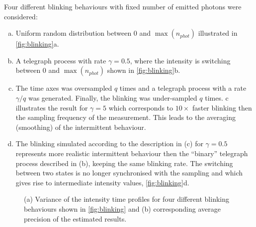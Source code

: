 Four different blinking behaviours with fixed number of emitted photons were considered: 
%
\begin{enumerate}[(a)]
	\item
	Uniform random distribution between $0$ and $\max(n_{phot})$ illustrated in  \autoref{fig:blinking}a. 
	\item
	A telegraph process with rate $\gamma=0.5$, where the intensity is switching between $0$ and $\max(n_{phot})$ shown in \autoref{fig:blinking}b.
	\item
	The time axes was oversampled $q$ times and a telegraph process with a rate $\gamma/q$ was generated. Finally, the blinking was under-sampled $q$ times. c illustrates the result for $\gamma=5$ which corresponds to $10\times$ faster blinking then the sampling frequency of the measurement. This leads to the averaging (smoothing) of the intermittent behaviour.
	\item
	The blinking simulated according to the description in (c) for $\gamma=0.5$ represents more realistic intermittent behaviour then the ``binary'' telegraph process described in (b), keeping the same blinking rate. The switching between two states is no longer synchronised with the sampling and which gives rise to intermediate intensity values, \autoref{fig:blinking}d. 
\end{enumerate}
	
\begin{figure}[!h]
	\centering
	\newcommand{\sizefig}{.40}
	\caption{(a) Variance of the intensity time profiles for four different blinking behaviours shown in \autoref{fig:blinking} and (b) corresponding average precision of the estimated results.}		
\end{figure}

